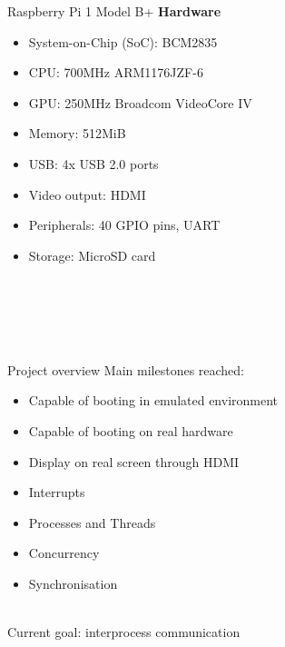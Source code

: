 \documentclass[10pt]{beamer}
\begin{document}
\begin{frame}{Raspberry Pi 1 Model B+}
    \textbf{Hardware}
    \begin{itemize}
        \item System-on-Chip (SoC): BCM2835
        \item CPU: 700MHz ARM1176JZF-6
        \item GPU: 250MHz Broadcom VideoCore IV
        \item Memory: 512MiB
        \item USB: 4x USB 2.0 ports
        \item Video output: HDMI
        \item Peripherals: 40 GPIO pins, UART
        \item Storage: MicroSD card
    \end{itemize} ~\\

     \\
     \\
     \\
\end{frame}

\begin{frame}{Project overview}
    Main milestones reached:
    \begin{itemize}
        \item Capable of booting in emulated environment
        \item Capable of booting on real hardware
        \item Display on real screen through HDMI
        \item Interrupts
        \item Processes and Threads
        \item Concurrency
        \item Synchronisation
    \end{itemize} ~\\

    Current goal: interprocess communication
\end{frame}
\end{document}
